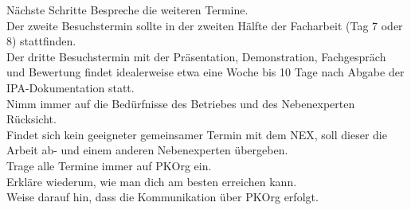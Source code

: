 \begin{taskitem}{Nächste Schritte}
  Bespreche die weiteren Termine.\\Der zweite Besuchstermin sollte in der zweiten Hälfte der Facharbeit (Tag 7 oder 8) stattfinden.\\Der dritte Besuchstermin mit der Präsentation, Demonstration, Fachgespräch und Bewertung findet idealerweise etwa eine Woche bis 10 Tage nach Abgabe der IPA-Dokumentation statt.\\Nimm immer auf die Bedürfnisse des Betriebes und des Nebenexperten Rücksicht.\\Findet sich kein geeigneter gemeinsamer Termin mit dem NEX, soll dieser die Arbeit ab- und einem anderen Nebenexperten übergeben.\\Trage alle Termine immer auf PKOrg ein.\\Erkläre wiederum, wie man dich am besten erreichen kann.\\Weise darauf hin, dass die Kommunikation über PKOrg erfolgt.
\end{taskitem}